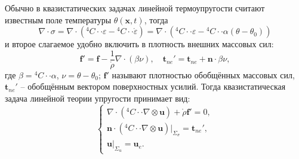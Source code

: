 Обычно в квазистатических задачах линейной термоупругости считают известным поле температуры
$\theta(\mathbf{x}, t)$, тогда
\[
  \nabla \cdot \sigma =
  \nabla \cdot ( {}^4 C \cdot\cdot \varepsilon - {}^4 C \cdot\cdot \mathring{\varepsilon} ) =
  \nabla \cdot ( {}^4 C \cdot\cdot \varepsilon - {}^4 C \cdot\cdot \alpha (\theta-\theta_0) )
\]
и второе слагаемое удобно включить в плотность внешних массовых сил:
\[
  \mathbf{f}' = \mathbf{f} - \dfrac{1}{\mathring{\rho}} \nabla \cdot (\beta \nu),
  \quad
  \mathbf{t}_{ne}' = \mathbf{t}_{ne} + \mathbf{n} \cdot \beta \nu,
\]
где $\beta = {}^4 C \cdot\cdot \alpha$, $\nu = \theta - \theta_0$; $\mathbf{f}'$ называют
плотностью обобщённых массовых сил, $\mathbf{t}_{ne}'$ -- обобщённым вектором поверхностных усилий.
Тогда квазистатическая задача линейной теории упругости принимает вид:
\[
  \begin{cases}
    \nabla \cdot \left( {}^4 C \cdot\cdot \nabla \otimes \mathbf{u} \right) + \mathring{\rho} \mathbf{f}' = 0, \\
    \mathbf{n} \cdot ({}^4 C \cdot\cdot \nabla \otimes \mathbf{u}) |_{\Sigma_\sigma} = \mathbf{t}_{ne}', \\
    \mathbf{u} |_{\Sigma_u} = \mathbf{u}_e.
  \end{cases}
\]

